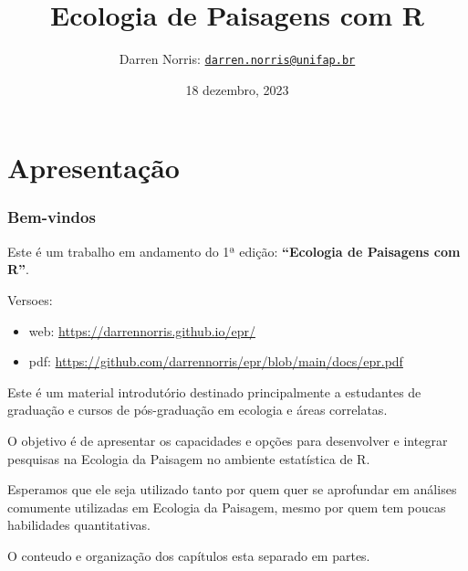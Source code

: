 \documentclass[
]{article}
\title{Ecologia de Paisagens com R}
\author{Darren Norris: \href{mailto:darren.norris@unifap.br}{\nolinkurl{darren.norris@unifap.br}}}
\date{18 dezembro, 2023}
\begin{document}
\maketitle

\renewcommand*\contentsname{Sumário}
{
\hypersetup{linkcolor=}
\setcounter{tocdepth}{3}
\tableofcontents
}
\newpage{}

\hypertarget{part-apresentauxe7uxe3o}{%
\part{Apresentação}\label{part-apresentauxe7uxe3o}}

\hypertarget{bem-vindos}{%
\section*{Bem-vindos}\label{bem-vindos}}

Este é um trabalho em andamento do 1ª edição:
\textbf{``Ecologia de Paisagens com R''}.

Versoes:

\begin{itemize}
\item
  web: \url{https://darrennorris.github.io/epr/}
\item
  pdf: \url{https://github.com/darrennorris/epr/blob/main/docs/epr.pdf}
\end{itemize}

Este é um material introdutório destinado principalmente a estudantes de graduação e cursos de pós-graduação em ecologia e áreas correlatas.

O objetivo é de apresentar os capacidades e opções para desenvolver e integrar pesquisas na Ecologia da Paisagem no ambiente estatística de R.

Esperamos que ele seja utilizado tanto por quem quer se aprofundar em análises comumente utilizadas em Ecologia da Paisagem, mesmo por quem tem poucas habilidades quantitativas.

O conteudo e organização dos capítulos esta separado em partes.
\end{document}
